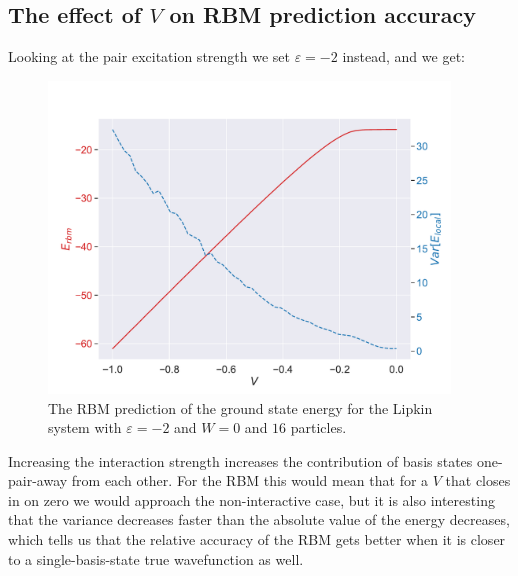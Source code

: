 \subsection{The effect of \texorpdfstring{$V$}{V} on RBM prediction accuracy}
Looking at the pair excitation strength we set $\varepsilon = -2$ instead, and we get:

\begin{figure}[H]
  \begin{center}
    \includegraphics[width=0.95\textwidth]{Figures/Plots/Lipkin/[V][-1.0-0.0][e=850][n=16][eps=-2][W=0].pdf}
  \end{center}
  \caption{The RBM prediction of the ground state energy for the Lipkin system with $\varepsilon=-2$ and $W=0$ and $16$ particles.}
\end{figure}

Increasing the interaction strength increases the contribution of basis states one-pair-away from each other. For the RBM this would mean that for a $V$ that closes in on zero we would approach the non-interactive case, but it is also interesting that the variance decreases faster than the absolute value of the energy decreases, which tells us that the relative accuracy of the RBM gets better when it is closer to a single-basis-state true wavefunction as well.

